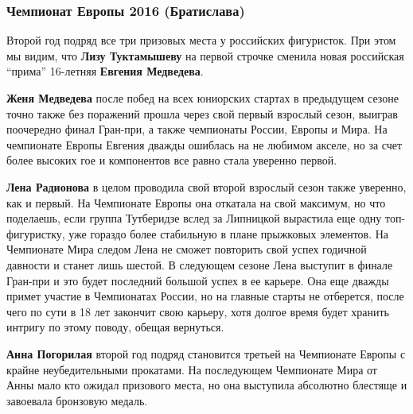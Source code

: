  
 
 
 
 
\subsubsection{Чемпионат Европы 2016 (Братислава)}

Второй год подряд все три призовых места у российских фигуристок. При этом мы
видим, что \textbf{Лизу Туктамышеву} на первой строчке сменила новая российская
\enquote{прима} 16-летняя \textbf{Евгения Медведева}. 


\textbf{Женя Медведева} после побед на всех юниорских стартах в предыдущем сезоне точно
также без поражений прошла через свой первый взрослый сезон, выиграв поочередно
финал Гран-при, а также чемпионаты России, Европы и Мира. На чемпионате Европы
Евгения дважды ошиблась на не любимом акселе, но за счет более высоких гое и
компонентов все равно стала уверенно первой.


\textbf{Лена Радионова} в целом проводила свой второй взрослый сезон также уверенно, как
и первый. На Чемпионате Европы она откатала на свой максимум, но что поделаешь,
если группа Тутберидзе вслед за Липницкой вырастила еще одну топ-фигуристку,
уже гораздо более стабильную в плане прыжковых элементов. На Чемпионате Мира
следом Лена не сможет повторить свой успех годичной давности и станет лишь
шестой. В следующем сезоне Лена выступит в финале Гран-при и это будет
последний большой успех в ее карьере. Она еще дважды примет участие в
Чемпионатах России, но на главные старты не отберется, после чего по сути в 18
лет закончит свою карьеру, хотя долгое время будет хранить интригу по этому
поводу, обещая вернуться.

\textbf{Анна Погорилая} второй год подряд становится третьей на Чемпионате Европы с
крайне неубедительными прокатами. На последующем Чемпионате Мира от Анны мало
кто ожидал призового места, но она выступила абсолютно блестяще и завоевала
бронзовую медаль.
